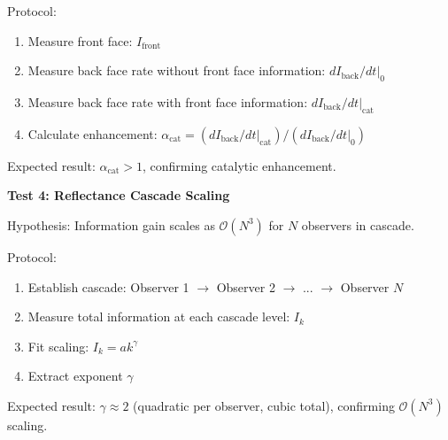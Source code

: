 \begin{theorem}
Protocol:
\begin{enumerate}
\item Measure front face: $I_{\text{front}}$
\item Measure back face rate without front face information: $dI_{\text{back}}/dt|_0$
\item Measure back face rate with front face information: $dI_{\text{back}}/dt|_{\text{cat}}$
\item Calculate enhancement: $\alpha_{\text{cat}} = (dI_{\text{back}}/dt|_{\text{cat}})/(dI_{\text{back}}/dt|_0)$
\end{enumerate}

Expected result: $\alpha_{\text{cat}} > 1$, confirming catalytic enhancement.

\textbf{Test 4: Reflectance Cascade Scaling}

Hypothesis: Information gain scales as $\mathcal{O}(N^3)$ for $N$ observers in cascade.

Protocol:
\begin{enumerate}
\item Establish cascade: Observer 1 $\to$ Observer 2 $\to$ ... $\to$ Observer $N$
\item Measure total information at each cascade level: $I_k$
\item Fit scaling: $I_k = a k^{\gamma}$
\item Extract exponent $\gamma$
\end{enumerate}

Expected result: $\gamma \approx 2$ (quadratic per observer, cubic total), confirming $\mathcal{O}(N^3)$ scaling.


\end{theorem}
